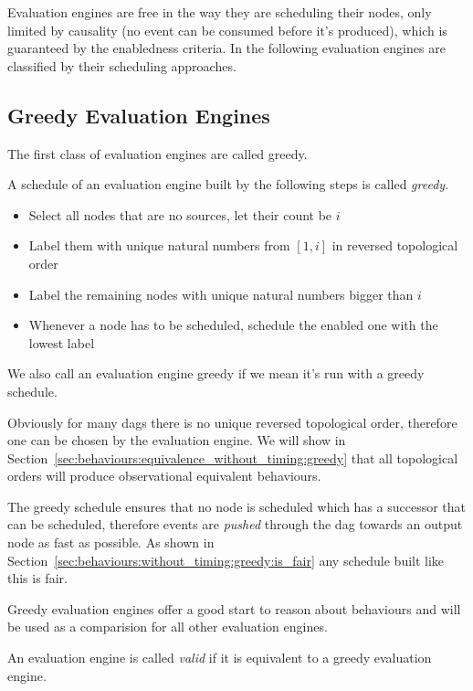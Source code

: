 Evaluation engines are free in the way they are scheduling their nodes, only limited by causality (no event can be consumed before it's produced), which is guaranteed by the enabledness criteria.
In the following evaluation engines are classified by their scheduling approaches.

\subsection{Greedy Evaluation Engines}
\label{sec:behaviours:without_timing:greedy}

The first class of evaluation engines are called greedy.

\begin{definition}\label{def:greedy_schedule}
  A schedule of an evaluation engine built by the following steps is called \emph{greedy}.
  \begin{itemize}
    \item Select all nodes that are no sources, let their count be \(i\)
    \item Label them with unique natural numbers from \([1,i]\) in reversed topological order
    \item Label the remaining nodes with unique natural numbers bigger than \(i\)
    \item Whenever a node has to be scheduled, schedule the enabled one with the lowest label
  \end{itemize}

  We also call an evaluation engine greedy if we mean it's run with a greedy schedule.
\end{definition}

Obviously for many \glspl{dag} there is no unique reversed topological order, therefore one can be chosen by the evaluation engine.
We will show in Section~\ref{sec:behaviours:equivalence_without_timing:greedy} that all topological orders will produce observational equivalent behaviours.

The greedy schedule ensures that no node is scheduled which has a successor that can be scheduled, therefore events are \emph{pushed} through the \gls{dag} towards an output node as fast as possible.
As shown in Section~\ref{sec:behaviours:without_timing:greedy:is_fair} any schedule built like this is fair.

Greedy evaluation engines offer a good start to reason about behaviours and will be used as a comparision for all other evaluation engines.

\begin{definition}[name = Valid Evaluation Engines]\label{def:valid_eval_engine}
  An evaluation engine is called \emph{valid} if it is equivalent to a greedy evaluation engine.
\end{definition}


